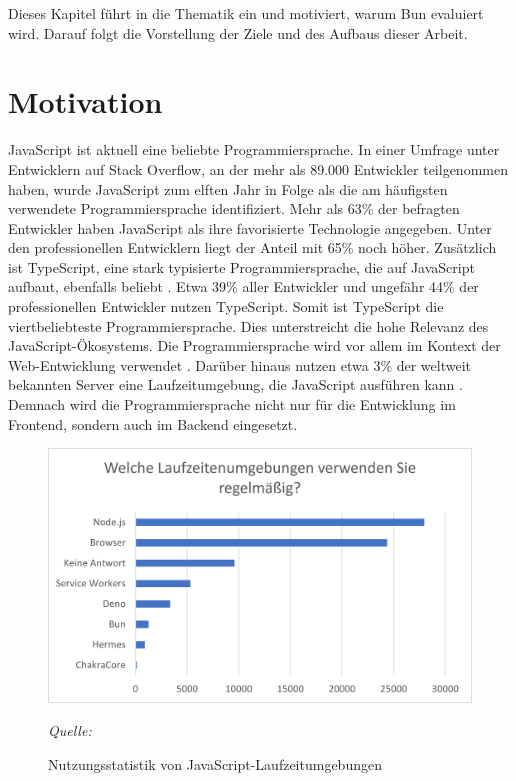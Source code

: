 \pagestyle{fancy-style}
 \label{ch:introduction}
Dieses Kapitel führt in die Thematik ein und motiviert, warum Bun evaluiert wird. Darauf folgt die Vorstellung der Ziele und des Aufbaus dieser Arbeit.

\section{Motivation} \label{sec:introduction-motivation}
JavaScript ist aktuell eine beliebte Programmiersprache. In einer Umfrage unter Entwicklern auf Stack Overflow, an der mehr als 89.000 Entwickler teilgenommen haben, wurde JavaScript zum elften Jahr in Folge als die am häufigsten verwendete Programmiersprache identifiziert. Mehr als 63\% der befragten Entwickler haben JavaScript als ihre favorisierte Technologie angegeben. Unter den professionellen Entwicklern liegt der Anteil mit 65\% noch höher. Zusätzlich ist TypeScript, eine stark typisierte Programmiersprache, die auf 
JavaScript aufbaut, ebenfalls beliebt \cite{Microsoft.o.J.}. Etwa 39\% aller Entwickler und ungefähr 44\% der professionellen Entwickler nutzen TypeScript. Somit ist TypeScript die viertbeliebteste Programmiersprache. Dies unterstreicht die hohe Relevanz des JavaScript-Ökosystems.\cite{StackOverflow.2023}\newline
Die Programmiersprache wird vor allem im Kontext der Web-Entwicklung verwendet \cite{Brown.November2019}. Darüber hinaus nutzen etwa 3\% der weltweit bekannten Server eine Laufzeitumgebung, die JavaScript ausführen kann \cite{QSuccess.2023}. Demnach wird die Programmiersprache nicht nur für die Entwicklung im Frontend, sondern auch im Backend eingesetzt.\\

\begin{figure}[h]
	\centering
	\includegraphics[width=\linewidth]{./images/WhichRuntimesDoYouUseRegularly}
	\caption{Nutzungsstatistik von JavaScript-Laufzeitumgebungen}
	\label{fig:runtime-share}
	\textit{Quelle: \cite{Greif.2022}}
\end{figure}


